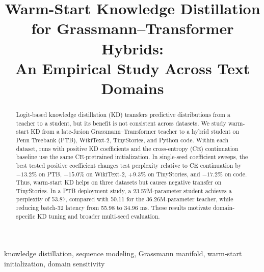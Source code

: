 \documentclass[conference]{IEEEtran}
\begin{document}
\title{Warm-Start Knowledge Distillation for Grassmann--Transformer Hybrids:\\
An Empirical Study Across Text Domains}

\author{
\and
{}
}

\maketitle

\begin{abstract}
Logit-based knowledge distillation (KD) transfers predictive distributions
from a teacher to a student, but its benefit is not consistent across
datasets.  We study warm-start KD from a late-fusion
Grassmann--Transformer teacher to a hybrid student on Penn Treebank (PTB),
WikiText-2, TinyStories, and Python code.  Within each dataset, runs with
positive KD coefficients and the cross-entropy (CE) continuation baseline use
the same CE-pretrained initialization.  In single-seed coefficient sweeps, the
best tested positive coefficient changes test perplexity relative to CE
continuation by $-13.2\%$ on PTB, $-15.0\%$ on WikiText-2, $+9.3\%$ on
TinyStories, and $-17.2\%$ on code.  Thus, warm-start KD helps on three
datasets but causes negative transfer on TinyStories.  In a PTB
deployment study, a 23.57M-parameter student achieves a perplexity of 53.87,
compared with 50.11 for the 36.26M-parameter teacher, while reducing batch-32
latency from 55.98 to 34.96 ms.  These results motivate domain-specific KD
tuning and broader multi-seed evaluation.
\end{abstract}

\begin{IEEEkeywords}
knowledge distillation, sequence modeling, Grassmann manifold, warm-start
initialization, domain sensitivity
\end{IEEEkeywords}
\end{document}
